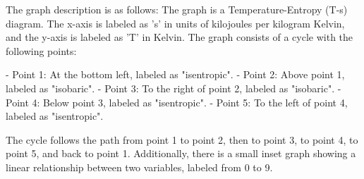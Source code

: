 The graph description is as follows: The graph is a Temperature-Entropy (T-s) diagram. The x-axis is labeled as 's' in units of kilojoules per kilogram Kelvin, and the y-axis is labeled as 'T' in Kelvin. The graph consists of a cycle with the following points:

- Point 1: At the bottom left, labeled as "isentropic".
- Point 2: Above point 1, labeled as "isobaric".
- Point 3: To the right of point 2, labeled as "isobaric".
- Point 4: Below point 3, labeled as "isentropic".
- Point 5: To the left of point 4, labeled as "isentropic".

The cycle follows the path from point 1 to point 2, then to point 3, to point 4, to point 5, and back to point 1. Additionally, there is a small inset graph showing a linear relationship between two variables, labeled from 0 to 9.